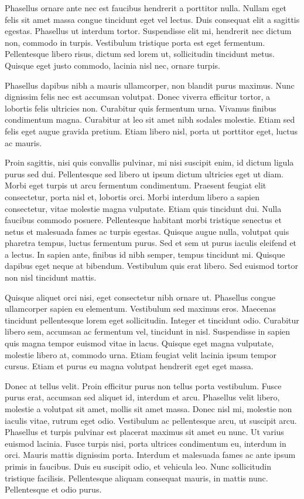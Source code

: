 Phasellus ornare ante nec est faucibus hendrerit a porttitor nulla. Nullam eget felis sit amet massa congue tincidunt eget vel lectus. Duis consequat elit a sagittis egestas. Phasellus ut interdum tortor. Suspendisse elit mi, hendrerit nec dictum non, commodo in turpis. Vestibulum tristique porta est eget fermentum. Pellentesque libero risus, dictum sed lorem ut, sollicitudin tincidunt metus. Quisque eget justo commodo, lacinia nisl nec, ornare turpis.

Phasellus dapibus nibh a mauris ullamcorper, non blandit purus maximus. Nunc dignissim felis nec est accumsan volutpat. Donec viverra efficitur tortor, a lobortis felis ultricies non. Curabitur quis fermentum urna. Vivamus finibus condimentum magna. Curabitur at leo sit amet nibh sodales molestie. Etiam sed felis eget augue gravida pretium. Etiam libero nisl, porta ut porttitor eget, luctus ac mauris.

Proin sagittis, nisi quis convallis pulvinar, mi nisi suscipit enim, id dictum ligula purus sed dui. Pellentesque sed libero ut ipsum dictum ultricies eget ut diam. Morbi eget turpis ut arcu fermentum condimentum. Praesent feugiat elit consectetur, porta nisl et, lobortis orci. Morbi interdum libero a sapien consectetur, vitae molestie magna vulputate. Etiam quis tincidunt dui. Nulla faucibus commodo posuere. Pellentesque habitant morbi tristique senectus et netus et malesuada fames ac turpis egestas. Quisque augue nulla, volutpat quis pharetra tempus, luctus fermentum purus. Sed et sem ut purus iaculis eleifend et a lectus. In sapien ante, finibus id nibh semper, tempus tincidunt mi. Quisque dapibus eget neque at bibendum. Vestibulum quis erat libero. Sed euismod tortor non nisl tincidunt mattis.

Quisque aliquet orci nisi, eget consectetur nibh ornare ut. Phasellus congue ullamcorper sapien eu elementum. Vestibulum sed maximus eros. Maecenas tincidunt pellentesque lorem eget sollicitudin. Integer et tincidunt odio. Curabitur libero sem, accumsan ac fermentum vel, tincidunt in nisl. Suspendisse in sapien quis magna tempor euismod vitae in lacus. Quisque eget magna vulputate, molestie libero at, commodo urna. Etiam feugiat velit lacinia ipsum tempor cursus. Etiam et purus eu magna volutpat hendrerit eget eget massa.

Donec at tellus velit. Proin efficitur purus non tellus porta vestibulum. Fusce purus erat, accumsan sed aliquet id, interdum et arcu. Phasellus velit libero, molestie a volutpat sit amet, mollis sit amet massa. Donec nisl mi, molestie non iaculis vitae, rutrum eget odio. Vestibulum ac pellentesque arcu, ut suscipit arcu. Phasellus et turpis pulvinar est placerat maximus sit amet eu nunc. Ut varius euismod lacinia. Fusce turpis nisi, porta ultrices condimentum eu, interdum in orci. Mauris mattis dignissim porta. Interdum et malesuada fames ac ante ipsum primis in faucibus. Duis eu suscipit odio, et vehicula leo. Nunc sollicitudin tristique facilisis. Pellentesque aliquam consequat mauris, in mattis nunc. Pellentesque et odio purus.

